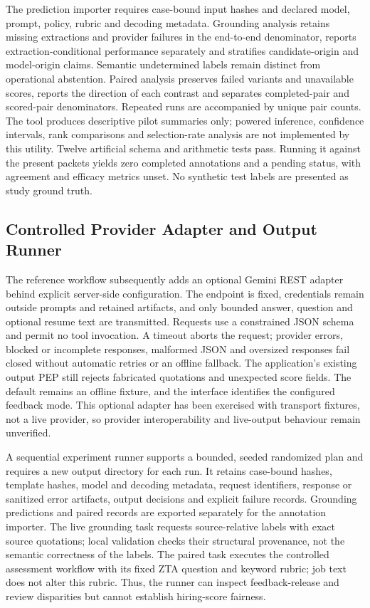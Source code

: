 \documentclass[conference]{IEEEtran}
\begin{document}
The prediction importer requires case-bound input hashes and declared model, prompt, policy, rubric and decoding metadata. Grounding analysis retains missing extractions and provider failures in the end-to-end denominator, reports extraction-conditional performance separately and stratifies candidate-origin and model-origin claims. Semantic undetermined labels remain distinct from operational abstention. Paired analysis preserves failed variants and unavailable scores, reports the direction of each contrast and separates completed-pair and scored-pair denominators. Repeated runs are accompanied by unique pair counts. The tool produces descriptive pilot summaries only; powered inference, confidence intervals, rank comparisons and selection-rate analysis are not implemented by this utility. Twelve artificial schema and arithmetic tests pass. Running it against the present packets yields zero completed annotations and a pending status, with agreement and efficacy metrics unset. No synthetic test labels are presented as study ground truth.

\subsection{Controlled Provider Adapter and Output Runner}

The reference workflow subsequently adds an optional Gemini REST adapter behind explicit server-side configuration. The endpoint is fixed, credentials remain outside prompts and retained artifacts, and only bounded answer, question and optional resume text are transmitted. Requests use a constrained JSON schema and permit no tool invocation. A timeout aborts the request; provider errors, blocked or incomplete responses, malformed JSON and oversized responses fail closed without automatic retries or an offline fallback. The application's existing output PEP still rejects fabricated quotations and unexpected score fields. The default remains an offline fixture, and the interface identifies the configured feedback mode. This optional adapter has been exercised with transport fixtures, not a live provider, so provider interoperability and live-output behaviour remain unverified.

A sequential experiment runner supports a bounded, seeded randomized plan and requires a new output directory for each run. It retains case-bound hashes, template hashes, model and decoding metadata, request identifiers, response or sanitized error artifacts, output decisions and explicit failure records. Grounding predictions and paired records are exported separately for the annotation importer. The live grounding task requests source-relative labels with exact source quotations; local validation checks their structural provenance, not the semantic correctness of the labels. The paired task executes the controlled assessment workflow with its fixed ZTA question and keyword rubric; job text does not alter this rubric. Thus, the runner can inspect feedback-release and review disparities but cannot establish hiring-score fairness.
\end{document}
